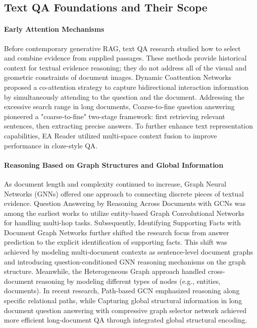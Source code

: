 \subsection{Text QA Foundations and Their Scope}

\paragraph{Early Attention Mechanisms}
Before contemporary generative RAG, text QA research studied how to select and combine evidence from supplied passages. These methods provide historical context for textual evidence reasoning; they do not address all of the visual and geometric constraints of document images. Dynamic Coattention Networks \cite{dynamiccoattention2017} proposed a co-attention strategy to capture bidirectional interaction information by simultaneously attending to the question and the document. Addressing the excessive search range in long documents, Coarse-to-fine question answering \cite{coarsetofine2017} pioneered a "coarse-to-fine" two-stage framework: first retrieving relevant sentences, then extracting precise answers. To further enhance text representation capabilities, EA Reader \cite{eareader2019} utilized multi-space context fusion to improve performance in cloze-style QA.

\paragraph{Reasoning Based on Graph Structures and Global Information}
As document length and complexity continued to increase, Graph Neural Networks (GNNs) offered one approach to connecting discrete pieces of textual evidence. Question Answering by Reasoning Across Documents with GCNs \cite{gcnmultihop2019} was among the earliest works to utilize entity-based Graph Convolutional Networks for handling multi-hop tasks. Subsequently, Identifying Supporting Facts with Document Graph Networks \cite{dgn2019} further shifted the research focus from answer prediction to the explicit identification of supporting facts. This shift was achieved by modeling multi-document contexts as sentence-level document graphs and introducing question-conditioned GNN reasoning mechanisms on the graph structure. Meanwhile, the Heterogeneous Graph approach \cite{heterograph2019} handled cross-document reasoning by modeling different types of nodes (e.g., entities, documents). In recent research, Path-based GCN \cite{pathgcn2020} emphasized reasoning along specific relational paths, while Capturing global structural information in long document question answering with compressive graph selector network \cite{cgsn2022} achieved more efficient long-document QA through integrated global structural encoding.

